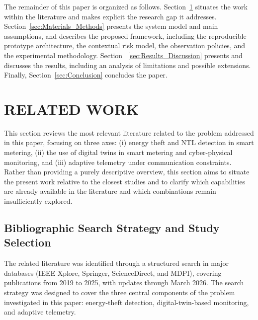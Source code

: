 \documentclass[journal]{IEEEtran}
\begin{document}
The remainder of this paper is organized as follows. Section~\ref{sec:related_work} situates the work within the literature and makes explicit the research gap it addresses. Section~\ref{sec:Materials_Methods} presents the system model and main assumptions, and describes the proposed framework, including the reproducible prototype architecture, the contextual risk model, the observation policies, and the experimental methodology. Section ~\ref{sec:Results_Discussion} presents and discusses the results, including an analysis of limitations and possible extensions. Finally, Section~\ref{sec:Conclusion} concludes the paper.

\section{RELATED WORK} \label{sec:related_work}
This section reviews the most relevant literature related to the problem addressed in this paper, focusing on three axes: (i) energy theft and NTL detection in smart metering, (ii) the use of digital twins in smart metering and cyber-physical monitoring, and (iii) adaptive telemetry under communication constraints. Rather than providing a purely descriptive overview, this section aims to situate the present work relative to the closest studies and to clarify which capabilities are already available in the literature and which combinations remain insufficiently explored.


\subsection{Bibliographic Search Strategy and Study Selection}
The related literature was identified through a structured search in major databases (IEEE Xplore, Springer, ScienceDirect, and MDPI), covering publications from 2019 to 2025, with updates through March 2026. The search strategy was designed to cover the three central components of the problem investigated in this paper: energy-theft detection, digital-twin-based monitoring, and adaptive telemetry.
\end{document}

